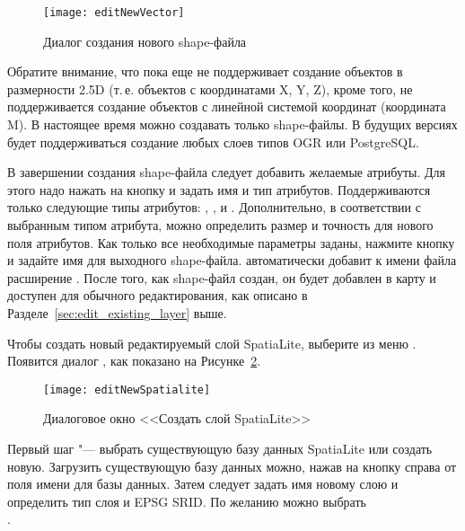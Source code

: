\begin{figure}[ht]
   \centering
   \texttt{[image: editNewVector]}
   \caption{Диалог создания нового shape-файла \wincaption}\label{fig:newvectorlayer}
\end{figure}

Обратите внимание, что \qg пока еще не поддерживает создание объектов в
размерности 2.5D (т.\,е. объектов с координатами X, Y, Z), кроме того, не
поддерживается создание объектов с линейной системой координат (координата M).
В настоящее время можно создавать только shape-файлы. В будущих
версиях \qg будет поддерживаться создание любых слоев типов OGR или PostgreSQL.

В завершении создания shape-файла следует добавить желаемые атрибуты. Для
этого надо нажать на кнопку   и задать имя и тип атрибутов.
Поддерживаются только следующие типы атрибутов:  ,
, и .
Дополнительно, в соответствии с выбранным типом атрибута, можно определить
размер и точность для нового поля атрибутов. Как только все необходимые
параметры заданы, нажмите кнопку  и задайте имя для выходного
shape-файла. \qg автоматически добавит к имени файла расширение .
После того, как shape-файл создан, он будет добавлен в карту и доступен для
обычного редактирования, как описано в Разделе~\ref{sec:edit_existing_layer} выше.

\label{sec:create spatialite}

Чтобы создать новый редактируемый слой SpatiaLite, выберите 
\arrow {} из меню
. Появится диалог , как
показано на Рисунке~\ref{fig:newspatialitelayer}.

\begin{figure}[ht]
   \centering
   \texttt{[image: editNewSpatialite]}
   \caption{Диалоговое окно <<Создать слой SpatiaLite>> \wincaption}\label{fig:newspatialitelayer}
\end{figure}

Первый шаг "--- выбрать существующую базу данных SpatiaLite или создать
новую. Загрузить существующую базу данных можно, нажав на кнопку 
справа от поля имени для базы данных. Затем следует задать имя новому слою и
определить тип слоя и EPSG SRID. По желанию можно выбрать \\
.

